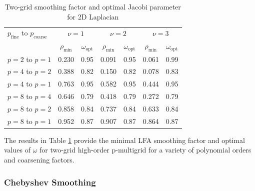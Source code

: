 \documentclass[review]{siamart190516}
\begin{document}
\begin{table}[ht!]
\begin{center}
\begin{tabular}{l cc cc cc}
  \toprule
  $p_{\text{fine}}$ to $p_{\text{coarse}}$  &  \multicolumn{2}{c}{$\nu = 1$}            &  \multicolumn{2}{c}{$\nu = 2$}         &  \multicolumn{2}{c}{$\nu = 3$}           \\
                                            &  $\rho_{\min}$  &  $\omega_{\text{opt}}$  &  $\rho_{\min}$ & $\omega_{\text{opt}}$  &  $\rho_{\min}$ & $\omega_{\text{opt}}$  \\
  \midrule
  $p = 2$ to $p = 1$          &  0.230 & 0.95  &  0.091 & 0.95  &  0.061 & 0.99   \\
  $p = 4$ to $p = 2$          &  0.388 & 0.82  &  0.150 & 0.82  &  0.078 & 0.83   \\
  $p = 4$ to $p = 1$          &  0.763 & 0.95  &  0.582 & 0.95  &  0.444 & 0.95   \\
  $p = 8$ to $p = 4$          &  0.646 & 0.79  &  0.418 & 0.79  &  0.272 & 0.79   \\
  $p = 8$ to $p = 2$          &  0.858 & 0.84  &  0.737 & 0.84  &  0.633 & 0.84   \\
  $p = 8$ to $p = 1$          &  0.952 & 0.87  &  0.907 & 0.87  &  0.864 & 0.87   \\
  \bottomrule
\end{tabular}
\end{center}
\caption{Two-grid smoothing factor and optimal Jacobi parameter for 2D Laplacian}
\label{table:two_grid_2d}
\end{table}

The results in Table \ref{table:two_grid_2d} provide the minimal LFA smoothing factor and optimal values of $\omega$ for two-grid high-order p-multigrid for a variety of polynomial orders and coarsening factors.

\subsubsection{Chebyshev Smoothing}
\end{document}
